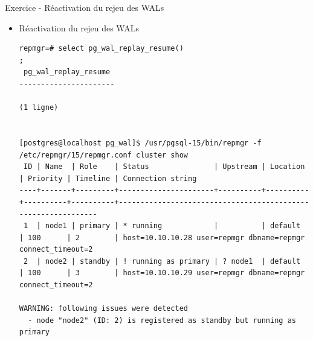 \begin{frame}[fragile]{Exercice - Réactivation du rejeu des WALs}

   \begin{itemize}
      \item Réactivation du rejeu des WALs
\begin{tiny}
\begin{Verbatim}[commandchars=\&\{\}]
repmgr=# select pg_wal_replay_resume()
;
 pg_wal_replay_resume
----------------------

(1 ligne)


[postgres@localhost pg_wal]$ /usr/pgsql-15/bin/repmgr -f /etc/repmgr/15/repmgr.conf cluster show                                                                                             
 ID | Name  | Role    | Status               | Upstream | Location | Priority | Timeline | Connection string                                                                                 
----+-------+---------+----------------------+----------+----------+----------+----------+--------------------------------------------------------------                                     
 1  | node1 | primary | * running            |          | default  | 100      | 2        | host=10.10.10.28 user=repmgr dbname=repmgr connect_timeout=2                                      
 2  | node2 | standby | ! running as primary | ? node1  | default  | 100      | 3        | host=10.10.10.29 user=repmgr dbname=repmgr connect_timeout=2                                      

WARNING: following issues were detected
  - node "node2" (ID: 2) is registered as standby but running as primary
\end{Verbatim}
\end{tiny}
   \end{itemize}

\end{frame}


